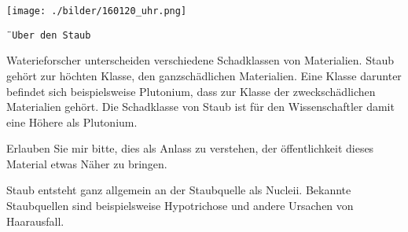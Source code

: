 \thispagestyle{empty}
\begin{center}
\texttt{[image: ./bilder/160120\_uhr.png]}
\end{center}
\vskip 2cm
{\Huge\color{farbe}\hfill{\tt{¨Uber den Staub}}}
\newpage
\lettrine[lines=2, lhang=.2, loversize=.25, lraise=0.05, findent=0.1em,
nindent=0em]{W}{}aterieforscher unterscheiden verschiedene Schadklassen von Materialien. Staub gehört zur höchten Klasse, den ganzschädlichen Materialien. Eine Klasse darunter befindet sich beispielsweise Plutonium, dass zur Klasse der zweckschädlichen Materialien gehört. Die Schadklasse von Staub ist für den Wissenschaftler damit eine Höhere als Plutonium.  

Erlauben Sie mir bitte, dies als Anlass zu verstehen, der öffentlichkeit dieses Material etwas Näher zu bringen. 

Staub entsteht ganz allgemein an der Staubquelle als Nucleii. Bekannte Staubquellen sind beispielsweise Hypotrichose und andere Ursachen von Haarausfall. 


\vfill
